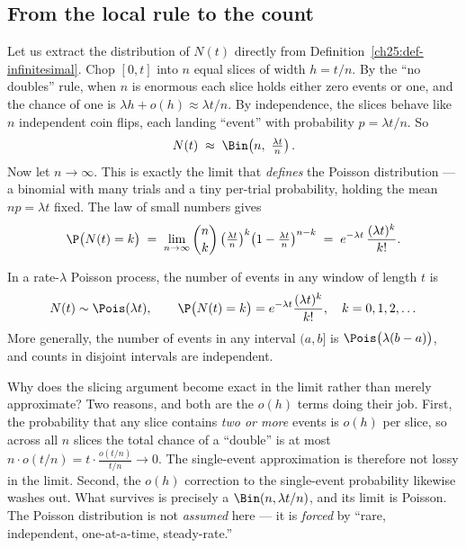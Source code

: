 \subsection{From the local rule to the count}

Let us extract the distribution of $N(t)$ directly from
Definition~\ref{ch25:def-infinitesimal}. Chop $[0,t]$ into $n$ equal slices of
width $h = t/n$. By the ``no doubles'' rule, when $n$ is enormous each slice
holds either zero events or one, and the chance of one is $\lambda h + o(h)
\approx \lambda t / n$. By independence, the slices behave like $n$ independent
coin flips, each landing ``event'' with probability $p = \lambda t/n$. So
\[
N(t) \;\approx\; \Bin\!\left(n,\ \tfrac{\lambda t}{n}\right).
\]
Now let $n \to \infty$. This is exactly the limit that \emph{defines} the Poisson
distribution --- a binomial with many trials and a tiny per-trial probability,
holding the mean $np = \lambda t$ fixed. The law of small numbers gives
\[
\P\big(N(t) = k\big) \;=\; \lim_{n\to\infty}\binom{n}{k}
\left(\tfrac{\lambda t}{n}\right)^{k}\!\left(1-\tfrac{\lambda t}{n}\right)^{n-k}
\;=\; e^{-\lambda t}\,\frac{(\lambda t)^{k}}{k!}.
\]

\begin{theorem}
\label{ch25:thm-counts-poisson}
In a rate-$\lambda$ Poisson process, the number of events in any window of length
$t$ is
\[
N(t) \sim \Pois(\lambda t), \qquad
\P\big(N(t)=k\big) = e^{-\lambda t}\frac{(\lambda t)^k}{k!}, \quad k=0,1,2,\dots
\]
More generally, the number of events in any interval $(a,b]$ is
$\Pois\big(\lambda(b-a)\big)$, and counts in disjoint intervals are independent.
\end{theorem}

\begin{whybox}
Why does the slicing argument become exact in the limit rather than merely
approximate? Two reasons, and both are the $o(h)$ terms doing their job. First,
the probability that any slice contains \emph{two or more} events is $o(h)$ per
slice, so across all $n$ slices the total chance of a ``double'' is at most
$n\cdot o(t/n) = t\cdot \frac{o(t/n)}{t/n} \to 0$. The single-event approximation
is therefore not lossy in the limit. Second, the $o(h)$ correction to the
single-event probability likewise washes out. What survives is precisely a
$\Bin(n, \lambda t/n)$, and its limit is Poisson. The Poisson distribution is not
\emph{assumed} here --- it is \emph{forced} by ``rare, independent, one-at-a-time,
steady-rate.''
\end{whybox}

